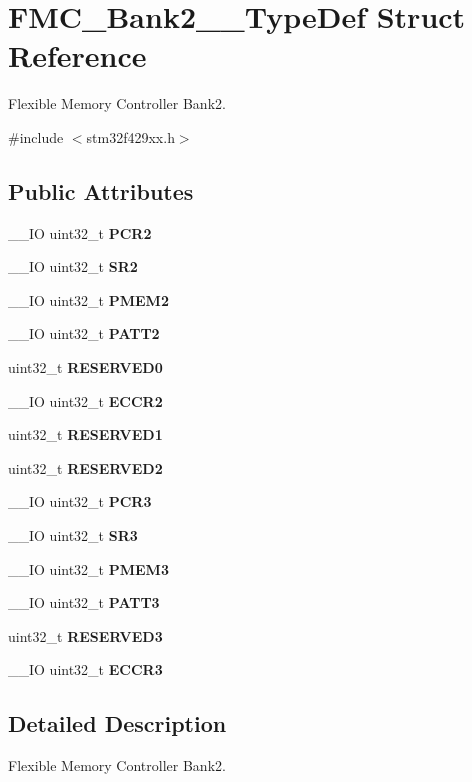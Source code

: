 \section{F\+M\+C\+\_\+\+Bank2\+\_\+\_\+\+Type\+Def Struct Reference}
\label{structFMC__Bank2__3__TypeDef}


Flexible Memory Controller Bank2.  




{\ttfamily \#include $<$stm32f429xx.\+h$>$}

\subsection*{Public Attributes}
\begin{DoxyCompactItemize}
\item 
\+\_\+\+\_\+\+IO uint32\+\_\+t \textbf{ P\+C\+R2}
\item 
\+\_\+\+\_\+\+IO uint32\+\_\+t \textbf{ S\+R2}
\item 
\+\_\+\+\_\+\+IO uint32\+\_\+t \textbf{ P\+M\+E\+M2}
\item 
\+\_\+\+\_\+\+IO uint32\+\_\+t \textbf{ P\+A\+T\+T2}
\item 
uint32\+\_\+t \textbf{ R\+E\+S\+E\+R\+V\+E\+D0}
\item 
\+\_\+\+\_\+\+IO uint32\+\_\+t \textbf{ E\+C\+C\+R2}
\item 
uint32\+\_\+t \textbf{ R\+E\+S\+E\+R\+V\+E\+D1}
\item 
uint32\+\_\+t \textbf{ R\+E\+S\+E\+R\+V\+E\+D2}
\item 
\+\_\+\+\_\+\+IO uint32\+\_\+t \textbf{ P\+C\+R3}
\item 
\+\_\+\+\_\+\+IO uint32\+\_\+t \textbf{ S\+R3}
\item 
\+\_\+\+\_\+\+IO uint32\+\_\+t \textbf{ P\+M\+E\+M3}
\item 
\+\_\+\+\_\+\+IO uint32\+\_\+t \textbf{ P\+A\+T\+T3}
\item 
uint32\+\_\+t \textbf{ R\+E\+S\+E\+R\+V\+E\+D3}
\item 
\+\_\+\+\_\+\+IO uint32\+\_\+t \textbf{ E\+C\+C\+R3}
\end{DoxyCompactItemize}


\subsection{Detailed Description}
Flexible Memory Controller Bank2. 

